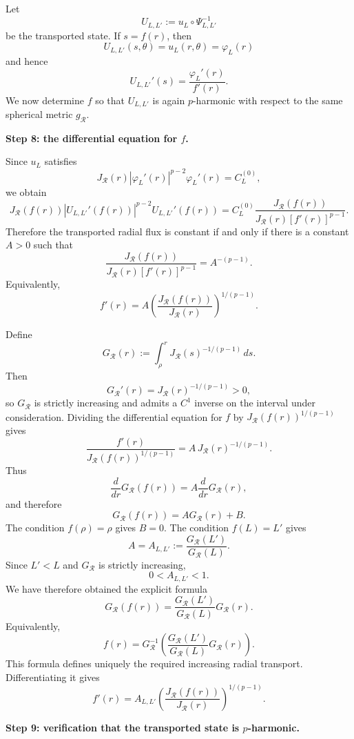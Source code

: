 \documentclass[11pt,a4paper]{article}
\theoremstyle{definition}
\theoremstyle{remark}
\begin{document}
Let
\[
U_{L,L'}:=u_L\circ\Psi_{L,L'}^{-1}
\]
be the transported state. If $s=f(r)$, then
\[
U_{L,L'}(s,\theta)=u_L(r,\theta)=\varphi_L(r)
\]
and hence
\[
U_{L,L'}'(s)=\frac{\varphi_L'(r)}{f'(r)}.
\]
We now determine $f$ so that $U_{L,L'}$ is again $p$-harmonic with
respect to the same spherical metric $g_{\mathcal R}$.

\medskip
\noindent
\textbf{Step 8: the differential equation for $f$.}

Since $u_L$ satisfies
\[
J_{\mathcal R}(r)|\varphi_L'(r)|^{p-2}\varphi_L'(r)
=C_L^{(0)},
\]
we obtain
\[
J_{\mathcal R}(f(r))
|U_{L,L'}'(f(r))|^{p-2}U_{L,L'}'(f(r))
=
C_L^{(0)}
\frac{J_{\mathcal R}(f(r))}
{J_{\mathcal R}(r)[f'(r)]^{p-1}}.
\]
Therefore the transported radial flux is constant if and only if there
is a constant $A>0$ such that
\[
\frac{J_{\mathcal R}(f(r))}
{J_{\mathcal R}(r)[f'(r)]^{p-1}}
=A^{-(p-1)}.
\label{eq:spherical-radial-compatibility}
\]
Equivalently,
\[
f'(r)
=A\left(
\frac{J_{\mathcal R}(f(r))}
{J_{\mathcal R}(r)}
\right)^{1/(p-1)}.
\]

Define
\[
G_{\mathcal R}(r)
:=\int_\rho^rJ_{\mathcal R}(s)^{-1/(p-1)}\,ds.
\]
Then
\[
G_{\mathcal R}'(r)=J_{\mathcal R}(r)^{-1/(p-1)}>0,
\]
so $G_{\mathcal R}$ is strictly increasing and admits a $C^1$ inverse
on the interval under consideration. Dividing the differential equation
for $f$ by $J_{\mathcal R}(f(r))^{1/(p-1)}$ gives
\[
\frac{f'(r)}{J_{\mathcal R}(f(r))^{1/(p-1)}}
=
A\,J_{\mathcal R}(r)^{-1/(p-1)}.
\]
Thus
\[
\frac{d}{dr}G_{\mathcal R}(f(r))
=A\frac{d}{dr}G_{\mathcal R}(r),
\]
and therefore
\[
G_{\mathcal R}(f(r))=AG_{\mathcal R}(r)+B.
\]
The condition $f(\rho)=\rho$ gives $B=0$. The condition $f(L)=L'$ gives
\[
A=A_{L,L'}
:=\frac{G_{\mathcal R}(L')}{G_{\mathcal R}(L)}.
\]
Since $L'<L$ and $G_{\mathcal R}$ is strictly increasing,
\[
0<A_{L,L'}<1.
\]
We have therefore obtained the explicit formula
\[
G_{\mathcal R}(f(r))
=\frac{G_{\mathcal R}(L')}{G_{\mathcal R}(L)}
G_{\mathcal R}(r).
\label{eq:spherical-conformal-radial-map}
\]
Equivalently,
\[
 f(r)=G_{\mathcal R}^{-1}
 \left(
 \frac{G_{\mathcal R}(L')}{G_{\mathcal R}(L)}
 G_{\mathcal R}(r)
 \right).
\]
This formula defines uniquely the required increasing radial transport.
Differentiating it gives
\[
 f'(r)=A_{L,L'}
 \left(
 \frac{J_{\mathcal R}(f(r))}{J_{\mathcal R}(r)}
 \right)^{1/(p-1)}.
\label{eq:spherical-f-derivative}
\]

\medskip
\noindent
\textbf{Step 9: verification that the transported state is $p$-harmonic.}
\end{document}
